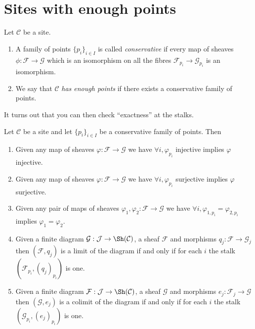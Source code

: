 \section{Sites with enough points}
\label{section-sites-enough-points}

\begin{definition}
\label{definition-enough-points}
Let $\mathcal{C}$ be a site.
\begin{enumerate}
\item A family of points $\{p_i\}_{i\in I}$ is called {\it conservative}
if every map of sheaves $\phi : \mathcal{F} \to \mathcal{G}$
which is an isomorphism on all the fibres $\mathcal{F}_{p_i}
\to \mathcal{G}_{p_i}$ is an isomorphism.
\item  We say that $\mathcal{C}$ {\it has enough points}
if there exists a conservative family of points.
\end{enumerate}
\end{definition}

\noindent
It turns out that you can then check ``exactness'' at the stalks.

\begin{lemma}
\label{lemma-exactness-stalks}
Let $\mathcal{C}$ be a site and let $\{p_i\}_{i\in I}$ be a conservative
family of points. Then
\begin{enumerate}
\item Given any map of sheaves $\varphi : \mathcal{F} \to \mathcal{G}$
we have $\forall i, \varphi_{p_i}$ injective implies $\varphi$ injective.
\item Given any map of sheaves $\varphi : \mathcal{F} \to \mathcal{G}$
we have $\forall i, \varphi_{p_i}$ surjective implies $\varphi$ surjective.
\item Given any pair of maps of sheaves
$\varphi_1, \varphi_2 : \mathcal{F} \to \mathcal{G}$
we have $\forall i, \varphi_{1, p_i} = \varphi_{2, p_i}$
implies $\varphi_1 = \varphi_2$.
\item Given a finite diagram $\mathcal{G} : \mathcal{J}
\to \Sh(\mathcal{C})$, a sheaf $\mathcal{F}$ and morphisms
$q_j : \mathcal{F} \to \mathcal{G}_j$ then $(\mathcal{F}, q_j)$
is a limit of the diagram if and only if for each $i$ the stalk
$(\mathcal{F}_{p_i}, (q_j)_{p_i})$ is one.
\item Given a finite diagram $\mathcal{F} : \mathcal{J}
\to \Sh(\mathcal{C})$, a sheaf $\mathcal{G}$ and morphisms
$e_j : \mathcal{F}_j \to \mathcal{G}$ then $(\mathcal{G}, e_j)$
is a colimit of the diagram if and only if for each $i$ the stalk
$(\mathcal{G}_{p_i}, (e_j)_{p_i})$ is one.
\end{enumerate}
\end{lemma}

